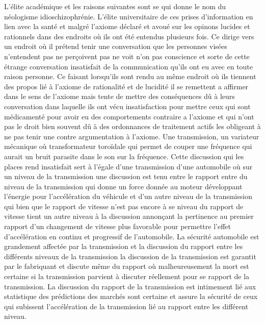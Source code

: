 \documentclass[12pt,letterpaper,oneside]{article}
\begin{document}
L’élite académique et les raisons suivantes sont se qui donne le nom du néologisme idioschizophrénie. L’élite universitaire de ces prises d’information en lien avec la santé et malgré l’axiome déclaré et avoué sur les opinons lucides et rationnels dans des endroits où ils ont été entendus plusieurs fois. Ce dirige vers un endroit où il prétend  tenir une conversation que les personnes visées n’entendent pas ne perçoivent pas ne voit n’on pas conscience et sorte de cette étrange conversation insatisfait de la communication qu’ils ont eu avec en toute raison personne. Ce faisant lorsqu’ils sont rendu au même endroit où ils tiennent des propos lié à l’axiome de rationalité et de lucidité il se remettent a affirmer dans le sens de l’axiome mais tente de mettre des conséquences dû à leurs conversation dans laquelle ils ont vécu insatisfaction pour mettre ceux qui sont médicamenté pour avoir eu des comportements contraire a l’axiome et qui n’ont pas le droit bien souvent dû à des ordonnances de traitement actifs les obligeant à ne pas tenir une contre argumentation à l’axiome. Une transmission, un variateur mécanique où transformateur toroïdale qui permet de couper une fréquence qui aurait un bruit parasite dans le son sur la fréquence. Cette discussion qui les places rend insatisfait sert à l’égale d’une transmission d’une automobile où sur un niveau de la transmission une discussion est tenu entre le rapport entre du niveau de la transmission qui donne un force donnée au moteur développant l’énergie pour l’accélération du véhicule et d’un autre niveau de la transmission qui bien que le rapport de vitesse n’est pas encore à se niveau du rapport de vitesse tient un autre niveau à la discussion annonçant la pertinence au premier rapport d’un changement de vitesse plus favorable pour permettre l’effet d’accélération en continu et progressif de l’automobile. La sécurité automobile est grandement affectée par la transmission et la discussion du rapport entre les différents niveaux de la transmission la discussion de la transmission est garantit par le fabriquant et discute même du rapport où malheureusement la mort est certaine si la transmission parvient à discuter réellement pour se rapport de la transmission. La discussion du rapport de la transmission est intimement lié aux statistique des prédictions des marchés sont certaine et assure la sécurité de ceux qui subissent l’accélération de la transmission lié au rapport entre les différent niveau.
\end{document}
